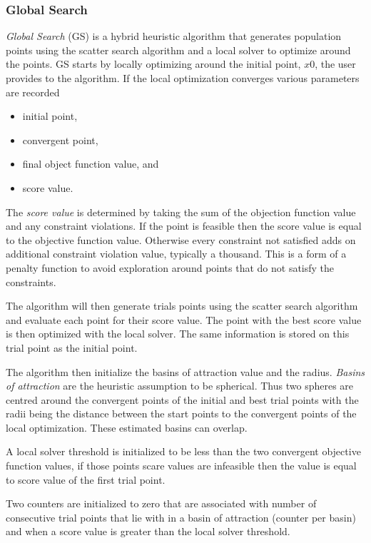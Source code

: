 \subsubsection{Global Search}
\textit{Global Search} (GS) is a hybrid heuristic algorithm that generates population points using the scatter search algorithm \cite{Glover1998a} and a local solver to optimize around the points. GS starts by locally optimizing around the initial point, $x0$, the user provides to the algorithm. If the local optimization converges various parameters are recorded
\begin{itemize}
    \item initial point,
    \item convergent point,
    \item final object function value, and
    \item score value. 
\end{itemize}

The \textit{score value} is determined by taking the sum of the objection function value and any constraint violations. If the point is feasible then the score value is equal to the objective function value. Otherwise every constraint not satisfied adds on additional constraint violation value, typically a thousand. This is a form of a penalty function to avoid exploration around points that do not satisfy the constraints. 

The algorithm will then generate trials points using the scatter search algorithm and evaluate each point for their score value. The point with the best score value is then optimized with the local solver. The same information is stored on this trial point as the initial point. 

The algorithm then initialize the basins of attraction value and the radius. \textit{Basins of attraction} are the heuristic assumption to be spherical. Thus two spheres are centred around the convergent points of the initial and best trial points with the radii being the distance between the start points to the convergent points of the local optimization. These estimated basins can overlap. 

A local solver threshold is initialized to be less than the two convergent objective function values, if those points scare values are infeasible then the value is equal to score value of the first trial point. 

Two counters are initialized to zero that are associated with number of consecutive trial points that lie with in a basin of attraction (counter per basin) and when a score value is greater than the local solver threshold. 

